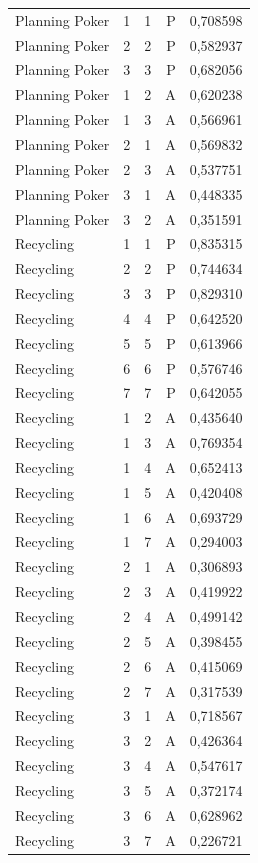 \begin{longtable}{lrrrr}
Planning Poker & 1 & 1 & P & 0,708598 \\
Planning Poker & 2 & 2 & P & 0,582937 \\
Planning Poker & 3 & 3 & P & 0,682056 \\
Planning Poker & 1 & 2 & A & 0,620238 \\
Planning Poker & 1 & 3 & A & 0,566961 \\
Planning Poker & 2 & 1 & A & 0,569832 \\
Planning Poker & 2 & 3 & A & 0,537751 \\
Planning Poker & 3 & 1 & A & 0,448335 \\
Planning Poker & 3 & 2 & A & 0,351591 \\
Recycling & 1 & 1 & P & 0,835315 \\
Recycling & 2 & 2 & P & 0,744634 \\
Recycling & 3 & 3 & P & 0,829310 \\
Recycling & 4 & 4 & P & 0,642520 \\
Recycling & 5 & 5 & P & 0,613966 \\
Recycling & 6 & 6 & P & 0,576746 \\
Recycling & 7 & 7 & P & 0,642055 \\
Recycling & 1 & 2 & A & 0,435640 \\
Recycling & 1 & 3 & A & 0,769354 \\
Recycling & 1 & 4 & A & 0,652413 \\
Recycling & 1 & 5 & A & 0,420408 \\
Recycling & 1 & 6 & A & 0,693729 \\
Recycling & 1 & 7 & A & 0,294003 \\
Recycling & 2 & 1 & A & 0,306893 \\
Recycling & 2 & 3 & A & 0,419922 \\
Recycling & 2 & 4 & A & 0,499142 \\
Recycling & 2 & 5 & A & 0,398455 \\
Recycling & 2 & 6 & A & 0,415069 \\
Recycling & 2 & 7 & A & 0,317539 \\
Recycling & 3 & 1 & A & 0,718567 \\
Recycling & 3 & 2 & A & 0,426364 \\
Recycling & 3 & 4 & A & 0,547617 \\
Recycling & 3 & 5 & A & 0,372174 \\
Recycling & 3 & 6 & A & 0,628962 \\
Recycling & 3 & 7 & A & 0,226721 \\

\end{longtable}

